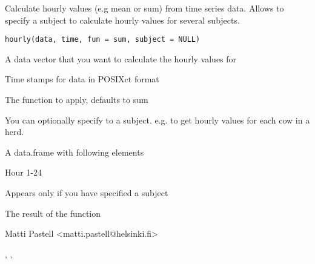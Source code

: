 \documentclass{book}
\begin{document}
\begin{Description}\relax
Calculate hourly values (e.g mean or sum) from time series data. Allows
to specify a subject to calculate hourly values for several subjects.
\end{Description}
\begin{Usage}
\begin{verbatim}
hourly(data, time, fun = sum, subject = NULL)
\end{verbatim}
\end{Usage}
\begin{Arguments}
\begin{ldescription}
\item[\code{data}] A data vector that you want to calculate the hourly values
for
\item[\code{time}] Time stamps for data in POSIXct format
\item[\code{fun}] The function to apply, defaults to sum
\item[\code{subject}] You can optionally specify to a subject. e.g. to get
hourly values for each cow in a herd.
\end{ldescription}
\end{Arguments}
\begin{Value}
A data.frame with following elements
\begin{ldescription}
\item[\code{Hour}] Hour 1-24
\item[\code{Subject}] Appears only if you have specified a subject
\item[\code{Result}] The result of the function
\end{ldescription}
\end{Value}
\begin{Author}\relax
Matti Pastell <matti.pastell@helsinki.fi>
\end{Author}
\begin{SeeAlso}\relax
{}, ,
\end{SeeAlso}
\begin{Examples}
\end{Examples}
\end{document}
